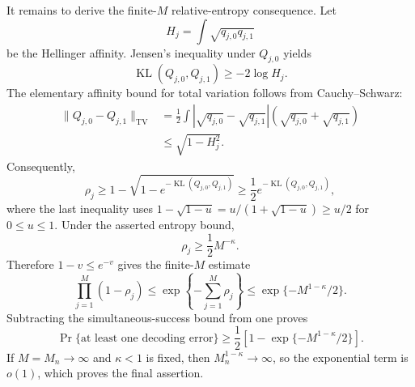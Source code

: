 It remains to derive the finite-\(M\) relative-entropy consequence.  Let
\[
 H_j=\int\sqrt{q_{j,0}q_{j,1}}
\]
be the Hellinger affinity.  Jensen's inequality under \(Q_{j,0}\) yields
\[
 \operatorname{KL}(Q_{j,0},Q_{j,1})\geq-2\log H_j.
\]
The elementary affinity bound for total variation follows from Cauchy--Schwarz:
\[
\begin{aligned}
 \|Q_{j,0}-Q_{j,1}\|_{\mathrm{TV}}
 &=\frac12\int|\sqrt{q_{j,0}}-\sqrt{q_{j,1}}|
             (\sqrt{q_{j,0}}+\sqrt{q_{j,1}})\\
 &\leq\sqrt{1-H_j^2}.
\end{aligned}
\]
Consequently,
\[
 \rho_j
 \geq1-\sqrt{1-e^{-\operatorname{KL}(Q_{j,0},Q_{j,1})}}
 \geq\frac12e^{-\operatorname{KL}(Q_{j,0},Q_{j,1})},
\]
where the last inequality uses \(1-\sqrt{1-u}=u/(1+\sqrt{1-u})\geq u/2\) for \(0\leq u\leq1\).  Under the asserted entropy bound,
\[
 \rho_j\geq\frac12M^{-\kappa}.
\]
Therefore \(1-v\leq e^{-v}\) gives the finite-\(M\) estimate
\[
 \prod_{j=1}^M(1-\rho_j)
 \leq\exp\!\left\{-\sum_{j=1}^M\rho_j\right\}
 \leq\exp\{-M^{1-\kappa}/2\}.
\]
Subtracting the simultaneous-success bound from one proves
\[
 \Pr\{\text{at least one decoding error}\}
 \geq\frac12\left[1-\exp\{-M^{1-\kappa}/2\}\right].
\]
If \(M=M_n\to\infty\) and \(\kappa<1\) is fixed, then \(M_n^{1-\kappa}\to\infty\), so the exponential term is \(o(1)\), which proves the final assertion.